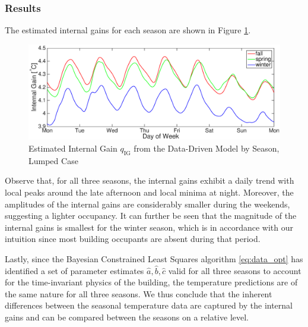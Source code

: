 \subsubsection{Results}
The estimated internal gains for each season are shown in Figure \ref{fig:qig_comparison_plot}.
\begin{figure}[hbtp]
\centering
\vspace*{-0.0cm}
\hspace*{-0.6cm}
\includegraphics[scale=0.22]{chapters/building_model/figures/data_lump_qig.eps}
\vspace*{-0.3cm}
\caption{Estimated Internal Gain $q_{\text{IG}}$ from the Data-Driven Model by Season, Lumped Case}
\vspace*{-0.3cm}
\label{fig:qig_comparison_plot}
\end{figure}
Observe that, for all three seasons, the internal gains exhibit a daily trend with local peaks around the late afternoon and local minima at night. Moreover, the amplitudes of the internal gains are considerably smaller during the weekends, suggesting a lighter occupancy. It can further be seen that the magnitude of the internal gains is smallest for the winter season, which is in accordance with our intuition since most building occupants are absent during that period.


Lastly, since the Bayesian Constrained Least Squares algorithm \eqref{eq:data_opt} has identified a set of parameter estimates $\hat{a}, \hat{b}, \hat{c}$ valid for all three seasons to account for the time-invariant physics of the building, the temperature predictions are of the same nature for all three seasons. We thus conclude that the inherent differences between the seasonal temperature data are captured by the internal gains and can be compared between the seasons on a relative level.

